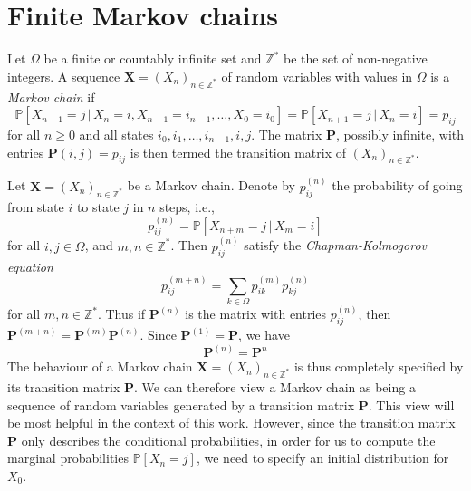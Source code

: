 \section{Finite Markov chains}
\label{sec:finite-markov-chain}
\begin{definition}
  \label{def:6}
  Let $\Omega$ be a finite or countably infinite set and
  $\mathbb{Z}^{*}$ be the set of non-negative integers. A sequence
  $\mathbf{X} = (X_n)_{n \in \mathbb{Z}^{*}}$ of random variables with values in
  $\Omega$ is a {\em Markov chain} if
  \begin{equation}
    \label{eq:8}
    \mathbb{P}[X_{n+1} = j \, | \, X_n = i, X_{n-1} = i_{n-1},
    \dots, X_0 = i_0] = \mathbb{P}[X_{n+1} = j \, | \, X_n = i] =
    p_{ij}
  \end{equation}
  for all $n \geq 0$ and all states $i_0, i_1, \dots, i_{n-1}, i,
  j$. The matrix $\mathbf{P}$, possibly infinite, with entries
  $\mathbf{P}(i,j) = p_{ij}$ is then termed the transition matrix of
  $(X_n)_{n \in \mathbb{Z}^*}$.
\end{definition}
Let $\mathbf{X} = (X_n)_{n \in \mathbb{Z}^*}$ be a Markov
chain. Denote by $p_{ij}^{(n)}$ the probability of going from state
$i$ to state $j$ in $n$ steps, i.e.,
\begin{equation}
  \label{eq:11}
  p_{ij}^{(n)} = \mathbb{P}[ X_{n + m } = j \, | \, X_m = i]
\end{equation}
for all $i, j \in \Omega$, and $m,n \in \mathbb{Z}^{*}$. Then
$p_{ij}^{(n)}$ satisfy the {\em Chapman-Kolmogorov equation}
\begin{equation}
  \label{eq:12}
  p_{ij}^{(m+n)} = \sum_{k \in \Omega}{p_{ik}^{(m)}p_{kj}^{(n)}}
\end{equation}
for all $m,n \in \mathbb{Z}^{*}$. Thus if $\mathbf{P}^{(n)}$ is the
matrix with entries $p_{ij}^{(n)}$, then $\mathbf{P}^{(m+n)} =
\mathbf{P}^{(m)}\mathbf{P}^{(n)}$. Since $\mathbf{P}^{(1)} =
\mathbf{P}$, we have
\begin{equation}
  \label{eq:13}
  \mathbf{P}^{(n)} = \mathbf{P}^{n}
\end{equation}
The behaviour of a Markov chain $\mathbf{X} = (X_n)_{n \in
  \mathbb{Z}^{*}}$ is thus completely specified by its transition
matrix $\mathbf{P}$. We can therefore view a Markov chain as being a
sequence of random variables generated by a transition matrix
$\mathbf{P}$. This view will be most helpful in the context of this
work. However, since the transition matrix $\mathbf{P}$ only describes
the conditional probabilities, in order for us to compute the marginal
probabilities $\mathbb{P}[X_n = j]$, we need to specify an initial
distribution for $X_0$.

